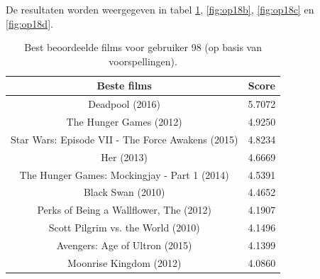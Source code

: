 \restoregeometry
\newpage



De resultaten worden weergegeven in tabel \ref{fig:op18a}, \ref{fig:op18b}, \ref{fig:op18c} en \ref{fig:op18d}.


\vspace{1.5cm}

\begin{table}[H]
\centering
\begin{tabular}{c|c}
\textbf{Beste films} & \textbf{Score} \\
\hline
    Deadpool (2016)                                   & 5.7072 \\
    The Hunger Games (2012)                           & 4.9250 \\
    Star Wars: Episode VII - The Force Awakens (2015) & 4.8234 \\
    Her (2013)                                        & 4.6669 \\
    The Hunger Games: Mockingjay - Part 1 (2014)      & 4.5391 \\
    Black Swan (2010)                                 & 4.4652 \\
    Perks of Being a Wallflower, The (2012)           & 4.1907 \\
    Scott Pilgrim vs. the World (2010)                & 4.1496 \\
    Avengers: Age of Ultron (2015)                    & 4.1399 \\
    Moonrise Kingdom (2012)                           & 4.0860 
\end{tabular}
\caption{Best beoordeelde films voor gebruiker 98 (op basis van voorspellingen).}
\label{fig:op18a}
\end{table}

